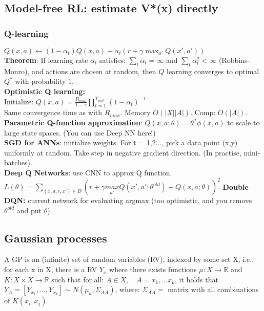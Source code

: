 \subsection{Model-free RL: estimate V*(x) directly}
\subsubsection{Q-learning}
$Q(x,a) \leftarrow (1-\alpha_t)Q(x,a) + \alpha_t(r+\gamma \max_{a'}Q(x', a'))$\\
\textbf{Theorem}: If learning rate $\alpha_t$ satisfies: $\sum_t \alpha_t=\infty$ and $\sum_t \alpha_t^2 < \infty$ (Robbins-Monro), and actions are chosen at random, then $Q$ learning converges to optimal $Q^*$ with probability 1.\\
\textbf{Optimistic Q learning:}\\
Initialize: $Q(x,a)=\frac{R_{max}}{1-\gamma}\prod_{t=1}^{T_{init}}(1-\alpha_t)^{-1}$\\
Same convergence time as with $R_{max}$. Memory $O(|X||A|)$. Comp: $O(|A|)$.\\
\textbf{Parametric Q-function approximation}: $Q(x,a;\theta)=\theta^T\phi (x,a)$ to scale to large state spaces. (You can use Deep NN here!)\\
\textbf{SGD for ANNs}: initialize weights. For t = 1,2..., pick a data point (x,y) uniformly at random. Take step in negative gradient direction. (In practise, mini-batches).\\
\textbf{Deep Q Networks}: use CNN to approx Q function.
$ L(\theta)=\sum_{(x,a,r,x')\in D}(r+\gamma\underset{a'}{max}Q(x',a';\theta^{old})-Q(x,a;\theta))^2$ \textbf{Double DQN:} current network for evaluating argmax (too optimistic, and you remove $\theta^{old}$ and put $\theta$).

\subsection{Gaussian processes}
A GP is an (infinite) set of random variables (RV), indexed by some set X, i.e., for each x in X, there is a RV $Y_x$ where there exists functions $\mu : X \rightarrow \mathbb{R}$ and $K: X \times X \rightarrow \mathbb{R}$ such that for all: $A \in X, \quad A={x_1,...x_k}$, it holds that $Y_A=[Y_{x_1},...,Y_{x_k}] \sim N(\mu_a, \Sigma_{AA})$, where: $\Sigma_{AA} =$ matrix with all combinations of $K(x_i, x_j)$.

